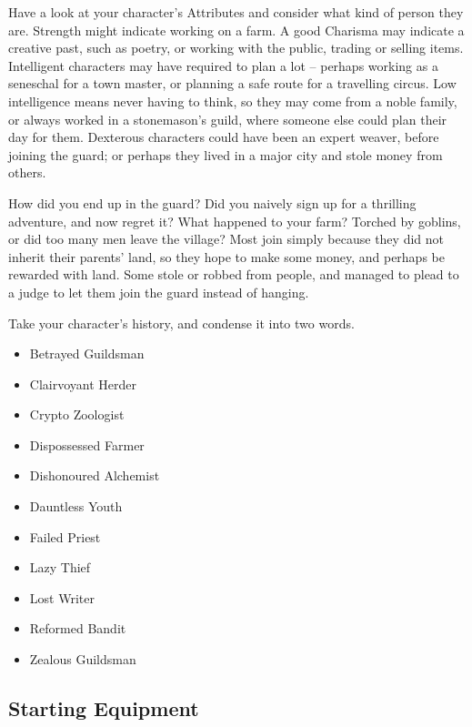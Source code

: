 \begin{multicols}{2}
Have a look at your character's Attributes and consider what kind of person they are.
Strength might indicate working on a farm.
A good Charisma may indicate a creative past, such as poetry, or working with the public, trading or selling items.
Intelligent characters may have required to plan a lot -- perhaps working as a seneschal for a town master, or planning a safe route for a travelling circus.
Low intelligence means never having to think, so they may come from a noble family, or always worked in a stonemason's guild, where someone else could plan their day for them.
Dexterous characters could have been an expert weaver, before joining the \gls{guard}; or perhaps they lived in a major city and stole money from others.

How did you end up in the \gls{guard}?
Did you naively sign up for a thrilling adventure, and now regret it?
What happened to your farm?
Torched by goblins, or did too many men leave the village?
Most join simply because they did not inherit their parents' land, so they hope to make some money, and perhaps be rewarded with land.
Some stole or robbed from people, and managed to plead to a judge to let them join the \gls{guard} instead of hanging.

Take your character's history, and condense it into two words.

\begin{multicols}{2}
\begin{itemize}
  \item
  Betrayed Guildsman
  \item
  Clairvoyant Herder
  \item
  Crypto Zoologist
  \item
  Dispossessed Farmer
  \item
  Dishonoured Alchemist
  \item
  Dauntless Youth
  \item
  Failed Priest
  \item
  Lazy Thief
  \item
  Lost Writer
  \item
  Reformed Bandit
  \item
  Zealous Guildsman
\end{itemize}
\end{multicols}


\subsection{Starting Equipment}
\label{start_equipment}


\end{multicols}
